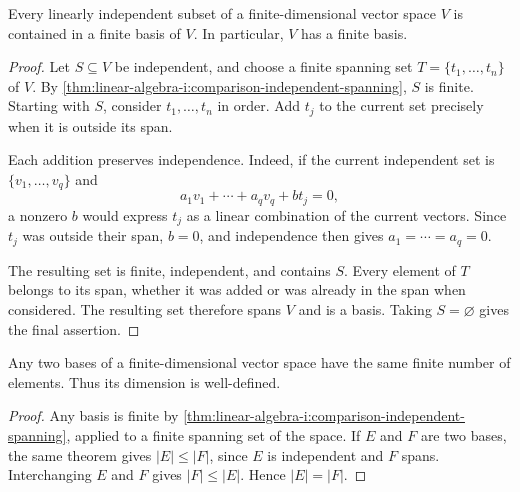 \begin{pendingreview}
\begin{proposition}
  \label{thm:linear-algebra-i:basis-extension}
  Every linearly independent subset of a finite-dimensional vector space
  \(V\) is contained in a finite basis of \(V\). In particular, \(V\)
  has a finite basis.
\end{proposition}

\begin{proof}
  Let \(S\subseteq V\) be independent, and choose a finite spanning set
  \(T=\{t_1,\ldots,t_n\}\) of \(V\). By
  \autoref{thm:linear-algebra-i:comparison-independent-spanning}, \(S\)
  is finite. Starting with \(S\), consider \(t_1,\ldots,t_n\) in order.
  Add \(t_j\) to the current set precisely when it is outside its span.

  Each addition preserves independence. Indeed, if the current independent
  set is \(\{v_1,\ldots,v_q\}\) and
  \[
    a_1v_1+\cdots+a_qv_q+bt_j=0,
  \]
  a nonzero \(b\) would express \(t_j\) as a linear combination of the
  current vectors. Since \(t_j\) was outside their span, \(b=0\), and
  independence then gives \(a_1=\cdots=a_q=0\).

  The resulting set is finite, independent, and contains \(S\). Every
  element of \(T\) belongs to its span, whether it was added or was already
  in the span when considered. The resulting set therefore spans \(V\)
  and is a basis. Taking \(S=\varnothing\) gives the final assertion.
\end{proof}

\begin{corollary}
  \label{thm:linear-algebra-i:basis-cardinality}
  Any two bases of a finite-dimensional vector space have the same finite
  number of elements. Thus its dimension is well-defined.
\end{corollary}

\begin{proof}
  Any basis is finite by
  \autoref{thm:linear-algebra-i:comparison-independent-spanning}, applied
  to a finite spanning set of the space. If \(E\) and \(F\) are two bases,
  the same theorem gives \(|E|\leq|F|\), since \(E\) is independent and
  \(F\) spans. Interchanging \(E\) and \(F\) gives \(|F|\leq|E|\).
  Hence \(|E|=|F|\).
\end{proof}
\end{pendingreview}


